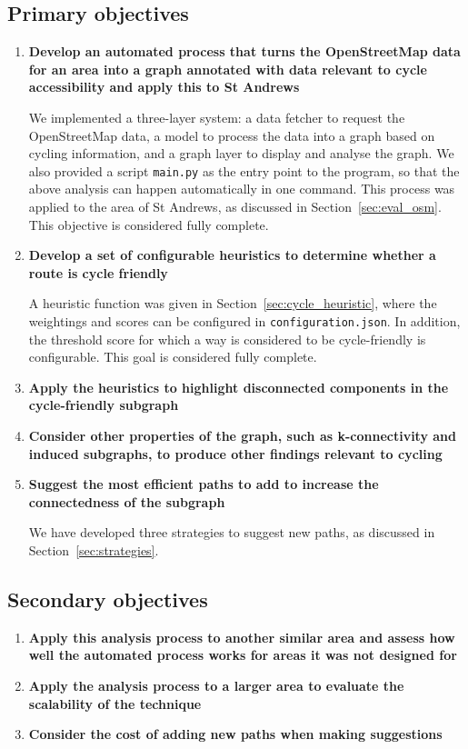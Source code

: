 \documentclass[12pt,a4paper]{report}
\begin{document}
\subsection{Primary objectives}
\begin{enumerate}
    \item \textbf{Develop an automated process that turns the OpenStreetMap data for an area into a graph annotated with data relevant to cycle accessibility and apply this to St Andrews}

    We implemented a three-layer system: a data fetcher to request the OpenStreetMap data, a model to process the data into a graph based on cycling information, and a graph layer to display and analyse the graph. We also provided a script \texttt{main.py} as the entry point to the program, so that the above analysis can happen automatically in one command. This process was applied to the area of St Andrews, as discussed in Section~\ref{sec:eval_osm}. This objective is considered fully complete.

    \item \textbf{Develop a set of configurable heuristics to determine whether a route is cycle friendly}

    A heuristic function was given in Section~\ref{sec:cycle_heuristic}, where the weightings and scores can be configured in \texttt{configuration.json}. In addition, the threshold score for which a way is considered to be cycle-friendly is configurable. This goal is considered fully complete.

    \item \textbf{Apply the heuristics to highlight disconnected components in the cycle-friendly subgraph}

    \item \textbf{Consider other properties of the graph, such as k-connectivity and induced subgraphs, to produce other findings relevant to cycling}

    \item \textbf{Suggest the most efficient paths to add to increase the connectedness of the subgraph}

    We have developed three strategies to suggest new paths, as discussed in Section~\ref{sec:strategies}.
\end{enumerate}

\subsection{Secondary objectives}
\begin{enumerate}
    \item \textbf{Apply this analysis process to another similar area and assess how well the automated process works for areas it was not designed for}

    \item \textbf{Apply the analysis process to a larger area to evaluate the scalability of the technique}

    \item \textbf{Consider the cost of adding new paths when making suggestions}
\end{enumerate}
\end{document}

